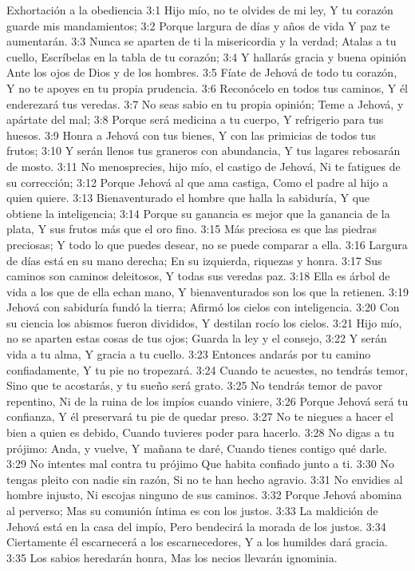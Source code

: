Exhortación a la obediencia  
3:1 Hijo mío, no te olvides de mi ley,  
Y tu corazón guarde mis mandamientos;  
3:2 Porque largura de días y años de vida  
Y paz te aumentarán.  
3:3 Nunca se aparten de ti la misericordia y la verdad;  
Atalas a tu cuello,  
Escríbelas en la tabla de tu corazón;  
3:4 Y hallarás gracia y buena opinión  
Ante los ojos de Dios y de los hombres. 
3:5 Fíate de Jehová de todo tu corazón,  
Y no te apoyes en tu propia prudencia.  
3:6 Reconócelo en todos tus caminos,  
Y él enderezará tus veredas.  
3:7 No seas sabio en tu propia opinión; 
Teme a Jehová, y apártate del mal;  
3:8 Porque será medicina a tu cuerpo,  
Y refrigerio para tus huesos.  
3:9 Honra a Jehová con tus bienes, 
Y con las primicias de todos tus frutos;  
3:10 Y serán llenos tus graneros con abundancia,  
Y tus lagares rebosarán de mosto.  
3:11 No menosprecies, hijo mío, el castigo de Jehová,  
Ni te fatigues de su corrección; 
3:12 Porque Jehová al que ama castiga, 
Como el padre al hijo a quien quiere. 
3:13 Bienaventurado el hombre que halla la sabiduría,  
Y que obtiene la inteligencia;  
3:14 Porque su ganancia es mejor que la ganancia de la plata,  
Y sus frutos más que el oro fino.  
3:15 Más preciosa es que las piedras preciosas;  
Y todo lo que puedes desear, no se puede comparar a ella.  
3:16 Largura de días está en su mano derecha;  
En su izquierda, riquezas y honra.  
3:17 Sus caminos son caminos deleitosos,  
Y todas sus veredas paz.  
3:18 Ella es árbol de vida a los que de ella echan mano,  
Y bienaventurados son los que la retienen.  
3:19 Jehová con sabiduría fundó la tierra;  
Afirmó los cielos con inteligencia.  
3:20 Con su ciencia los abismos fueron divididos,  
Y destilan rocío los cielos.  
3:21 Hijo mío, no se aparten estas cosas de tus ojos;  
Guarda la ley y el consejo,  
3:22 Y serán vida a tu alma,  
Y gracia a tu cuello.  
3:23 Entonces andarás por tu camino confiadamente,  
Y tu pie no tropezará.  
3:24 Cuando te acuestes, no tendrás temor,  
Sino que te acostarás, y tu sueño será grato.  
3:25 No tendrás temor de pavor repentino,  
Ni de la ruina de los impíos cuando viniere,  
3:26 Porque Jehová será tu confianza,  
Y él preservará tu pie de quedar preso.  
3:27 No te niegues a hacer el bien a quien es debido,  
Cuando tuvieres poder para hacerlo.  
3:28 No digas a tu prójimo: Anda, y vuelve,  
Y mañana te daré,  
Cuando tienes contigo qué darle.  
3:29 No intentes mal contra tu prójimo  
Que habita confiado junto a ti.  
3:30 No tengas pleito con nadie sin razón,  
Si no te han hecho agravio.  
3:31 No envidies al hombre injusto,  
Ni escojas ninguno de sus caminos.  
3:32 Porque Jehová abomina al perverso;  
Mas su comunión íntima es con los justos.  
3:33 La maldición de Jehová está en la casa del impío,  
Pero bendecirá la morada de los justos.  
3:34 Ciertamente él escarnecerá a los escarnecedores,  
Y a los humildes dará gracia. 
3:35 Los sabios heredarán honra,  
Mas los necios llevarán ignominia.  

